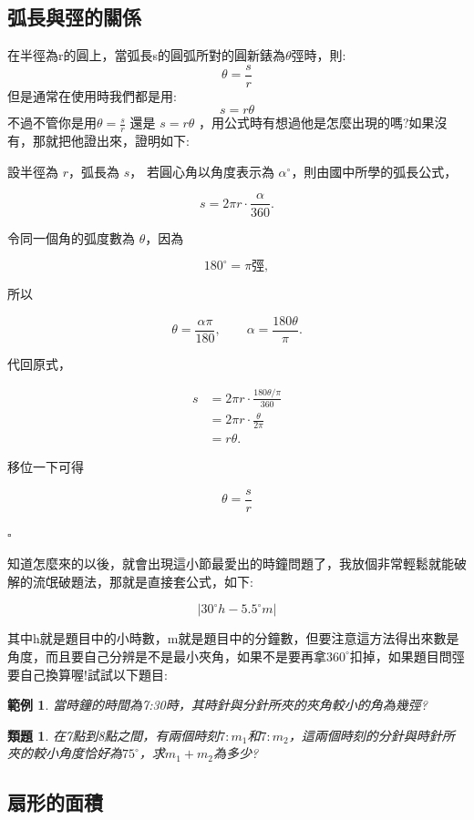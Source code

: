 \documentclass{article}
\newtheorem{example}{範例}[section]
\newtheorem{exercise}{類題}[section]
\begin{document}
\subsection{弧長與弳的關係}

在半徑為r的圓上，當弧長s的圓弧所對的圓新錶為$\theta$弳時，則:
\[\boxed{\theta = \frac{s}{r}}\]
但是通常在使用時我們都是用:
\[\boxed{s = r\theta}\]
不過不管你是用$\theta = \frac{s}{r}$ 還是 $s = r\theta$ ，用公式時有想過他是怎麼出現的嗎?如果沒有，那就把他證出來，證明如下:
\begin{proofbox}

設半徑為 $r$，弧長為 $s$，
若圓心角以角度表示為 $\alpha^\circ$，則由國中所學的弧長公式，

\[
s=2\pi r\cdot\frac{\alpha}{360}.
\]

令同一個角的弧度數為 $\theta$，因為

\[
180^\circ=\pi\text{弳},
\]

所以

\[
\theta=\frac{\alpha\pi}{180},
\qquad
\alpha=\frac{180\theta}{\pi}.
\]

代回原式，

\begin{align*}
s
&=2\pi r\cdot
\frac{180\theta/\pi}{360} \\[2mm]
&=2\pi r\cdot\frac{\theta}{2\pi} \\[2mm]
&=r\theta.
\end{align*}

移位一下可得

\[
\theta=\frac{s}{r}
\]

\hfill $\square$
\end{proofbox}
知道怎麼來的以後，就會出現這小節最愛出的時鐘問題了，我放個非常輕鬆就能破解的流氓破題法，那就是直接套公式，如下:

\[|30^\circ h-5.5^\circ m|\]

其中h就是題目中的小時數，m就是題目中的分鐘數，但要注意這方法得出來數是角度，而且要自己分辨是不是最小夾角，如果不是要再拿$360^\circ$扣掉，如果題目問弳要自己換算喔!試試以下題目:
\begin{example}
\normalfont
    當時鐘的時間為7:30時，其時針與分針所夾的夾角較小的角為幾弳?
\end{example}
\begin{exercise}
\normalfont
    在7點到8點之間，有兩個時刻$7:m_1$和$7:m_2$，這兩個時刻的分針與時針所夾的較小角度恰好為$75^\circ$，求$m_1 + m_2$為多少?
\end{exercise}

\subsection{扇形的面積}
\end{document}
